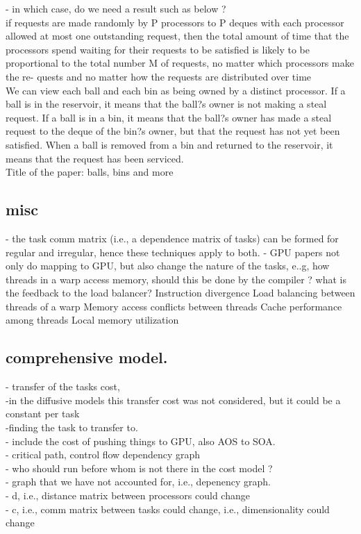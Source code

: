 \documentclass{article}
\begin{document}
- in which case, do we need a result such as below ?\\
if requests are made randomly by P processors to P deques with each processor allowed at most one outstanding request, then the total amount of time that the processors spend waiting for their requests to be satisfied is likely to be proportional to the total number M of requests, no matter which processors make the re- quests and no matter how the requests are distributed over time\\
We can  view each ball and each bin as being owned by a distinct processor. If a ball is in the reservoir, it means that the ball?s owner is not making a steal request. If a ball is in a bin, it means that the ball?s owner has made a steal request to the deque of the bin?s owner, but that the request has not yet been satisfied. When a ball is removed from a bin and returned to the reservoir, it means that the request has been serviced.\\
Title of the paper: balls, bins and more\\


\subsection{misc}
- the task comm matrix (i.e., a dependence matrix of tasks) can be formed for regular and irregular, hence these techniques apply to both. 
- GPU papers not only do mapping to GPU, but also change the nature of the
  tasks, e..g, how threads in a warp access memory, should this be done by the compiler ? what is the feedback to the load
balancer? 
Instruction divergence
Load balancing between threads of a warp
Memory access conflicts between threads
Cache performance among threads
Local memory utilization 


\subsection{comprehensive model.}
	- transfer of the tasks cost,\\ 
		-in the diffusive models this transfer cost was not considered, but it could be a constant per task\\
		-finding the task to transfer to.\\
		- include the cost of pushing things to GPU, also AOS to SOA. \\
	- critical path, control flow dependency graph\\
		- who should run before whom is not there in the cost model ?\\
		- graph that we have not accounted for, i.e., depenency graph. \\
	- d, i.e., distance matrix between processors could change\\
	- c, i.e., comm matrix between tasks could change, i.e., dimensionality could change\\
	
\end{document}
